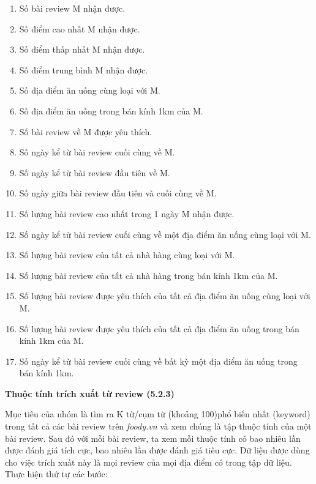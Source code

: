 \documentclass[12pt]{extarticle}
\begin{document}
				\begin{enumerate}
					\item Số bài review M nhận được.
					\item Số điểm cao nhất M nhận được.
					\item Số điểm thấp nhất M nhận được.
					\item Số điểm trung bình M nhận được.
					\item Số địa điểm ăn uống cùng loại với M.
					\item Số địa điểm ăn uống trong bán kính 1km của M.
					\item Số bài review về M được yêu thích.
					\item Số ngày kể từ bài review cuối cùng về M. 
					\item Số ngày kể từ bài review đầu tiên về M.
					\item Số ngày giữa bài review đầu tiên và cuối cùng về M. 
					\item Số lượng bài review cao nhất trong 1 ngày M nhận được.
					\item Số ngày kể từ bài review cuối cùng về một địa điểm ăn uống cùng loại với M.
					\item Số lượng bài review của tất cả nhà hàng cùng loại với M.
					\item Số lượng bài review của tất cả nhà hàng trong bán kính 1km của M.	
					\item Số lượng bài review được yêu thích của tất cả địa điểm ăn uống cùng loại với M.
					\item Số lượng bài review được yêu thích của tất cả địa điểm ăn uống trong bán kính 1km của M.
					\item Số ngày kể từ bài review cuối cùng về bất kỳ một địa điểm ăn uống trong bán kính 1km.
				\end{enumerate}
			\par \textbf{Thuộc tính trích xuất từ review (5.2.3)}
				\par Mục tiêu của nhóm là tìm ra K từ/cụm từ (khoảng 100)phổ biến nhất (keyword) trong tất cả các bài review trên \textit{foody.vn} và  xem chúng là tập thuộc tính của một bài review. Sau đó với mỗi bài review, ta xem mỗi thuộc tính có bao nhiêu lần được đánh giá tích cực, bao nhiêu lần được đánh giá tiêu cực. Dữ liệu được dùng cho việc trích xuất này là mọi review của mọi địa điểm có trong tập dữ liệu. Thực hiện thứ tự các bước:
\end{document}
